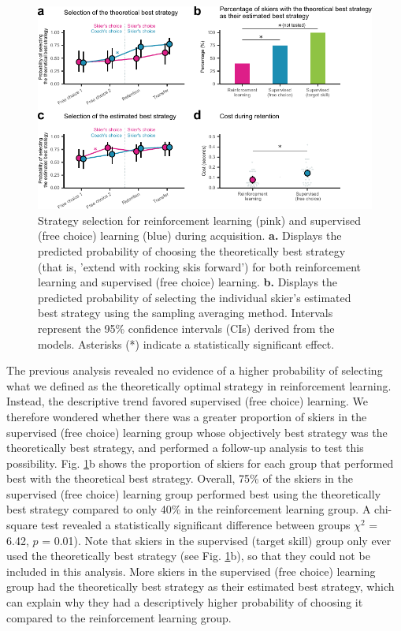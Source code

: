 \documentclass[pdflatex,sn-mathphys-num]{sn-jnl}%
\theoremstyle{thmstyleone}%
\theoremstyle{thmstyletwo}%
\theoremstyle{thmstylethree}%
\begin{document}
\begin{figure}[H]
\centering
\includegraphics{figures/figure_choice_estimated_4.pdf}
\caption{Strategy selection for reinforcement learning (pink) and supervised (free choice) learning (blue) during acquisition. \textbf{a.} Displays the predicted probability of choosing the theoretically best strategy (that is, 'extend with rocking skis forward') for both reinforcement learning and supervised (free choice) learning. \textbf{b.} Displays the predicted probability of selecting the individual skier's estimated best strategy using the sampling averaging method\cite{sutton_reinforcement_2018}. Intervals represent the 95\% confidence intervals (CIs) derived from the models. Asterisks (*) indicate a statistically significant effect.}\label{fig: choice_estimated}
\end{figure}

The previous analysis revealed no evidence of a higher probability of selecting what we defined as the theoretically optimal strategy in reinforcement learning. Instead, the descriptive trend favored supervised (free choice) learning. We therefore wondered whether there was a greater proportion of skiers in the supervised (free choice) learning group whose objectively best strategy was the theoretically best strategy, and performed a follow-up analysis to test this possibility. Fig. \ref{fig: choice_estimated}b shows the proportion of skiers for each group that performed best with the theoretical best strategy. Overall, 75\% of the skiers in the supervised (free choice) learning group performed best using the theoretically best strategy compared to only 40\% in the reinforcement learning group. A chi-square test revealed a statistically significant difference between groups $\chi^2$ = 6.42, $p$ = 0.01). Note that skiers in the supervised (target skill) group only ever used the theoretically best strategy (see Fig. \ref{fig: choice_estimated}b), so that they could not be included in this analysis. More skiers in the supervised (free choice) learning group had the theoretically best strategy as their estimated best strategy, which can explain why they had a descriptively higher probability of choosing it compared to the reinforcement learning group.
\end{document}
